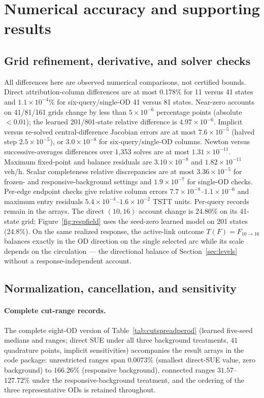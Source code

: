 \section{Numerical accuracy and supporting results}\label{supp:numdetail}\label{supp:transrecords}
\subsection{Grid refinement, derivative, and solver checks}\label{supp:accuracy}
All differences here are observed numerical comparisons, not certified
bounds. Direct attribution-column differences are at most 0.178\% for
11 versus 41 states and $1.1\times10^{-4}\%$ for six-query/single-OD
41 versus 81 states. Near-zero accounts on 41/81/161 grids change by
less than $5\times10^{-6}$ percentage points (absolute $<0.01$); the
learned 201/801-state relative difference is $4.97\times10^{-6}$.
Implicit versus re-solved central-difference Jacobian errors are at most
$7.6\times10^{-5}$ (halved step $2.5\times10^{-5}$), or
$3.0\times10^{-8}$ for six-query/single-OD columns. Newton versus
successive-averages differences over 1,353 solves are at most
$1.31\times10^{-11}$. Maximum fixed-point and balance residuals are
$3.10\times10^{-8}$ and $1.82\times10^{-11}$ veh/h. Scalar completeness
relative discrepancies are at most $3.36\times10^{-5}$ for
frozen- and responsive-background settings and $1.9\times10^{-7}$ for single-OD checks.
Per-edge endpoint checks give relative column errors
$7.7\times10^{-8}$--$1.1\times10^{-6}$ and maximum entry residuals
$5.4\times10^{-4}$--$1.6\times10^{-2}$ TSTT units. Per-query records
remain in the arrays. The direct $(10,16)$ account change is 24.80\%
on its 41-state grid; Figure~\ref{fig:respfield} uses the seed-zero
learned model on 201 states (24.8\%). On the same realized response,
the active-link outcome $T(F)=F_{10\to16}$ balances exactly in the OD
direction on the single selected arc while its scale depends on the
circulation --- the directional balance of
Section~\ref{sec:levels} without a response-independent account.

\subsection{Normalization, cancellation, and sensitivity}\label{supp:additional}
\paragraph{Complete cut-range records.}
The complete eight-OD version of Table~\ref{tab:cutspreadperod} (learned
five-seed medians and ranges; direct SUE under all three background
treatments, $41$ quadrature points, implicit sensitivities) accompanies
the result arrays in the code package: unrestricted ranges span
$0.0073\%$ (smallest direct-SUE value, zero background) to $166.26\%$
(responsive background), connected ranges $31.57$--$127.72\%$ under the
responsive-background treatment, and the ordering of the three
representative ODs is retained throughout.
